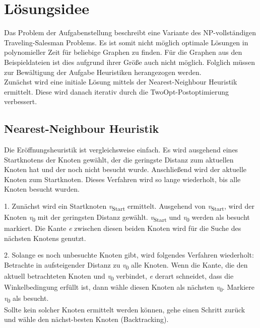 \maketitle
\tableofcontents

\vspace{0.5cm}


\section{Lösungsidee}\label{sec:losungsidee}
Das Problem der Aufgabenstellung beschreibt eine Variante des NP-vollständigen Traveling-Salesman Problems.
Es ist somit nicht möglich optimale Lösungen in polynomieller Zeit für beliebige Graphen zu finden.
Für die Graphen aus den Beispieldateien ist dies aufgrund ihrer Größe auch nicht möglich.
Folglich müssen zur Bewältigung der Aufgabe Heuristiken herangezogen werden. \\
Zunächst wird eine initiale Lösung mittels der Nearest-Neighbour Heuristik ermittelt.
Diese wird danach iterativ durch die TwoOpt-Postoptimierung verbessert.

\subsection{Nearest-Neighbour Heuristik}\label{subsec:nearest-neighbour-heuristik}
Die Eröffnungsheuristik ist vergleichsweise einfach.
Es wird ausgehend eines Startknotens der Knoten gewählt, der die
geringste Distanz zum aktuellen Knoten hat und der noch nicht besucht wurde.
Anschließend wird der aktuelle Knoten zum Startknoten.
Dieses Verfahren wird so lange wiederholt, bis alle Knoten besucht wurden.

1.
Zunächst wird ein Startknoten \textit{v}\textsubscript{Start} ermittelt.
Ausgehend von \textit{v}\textsubscript{Start}, wird der Knoten \textit{v}\textsubscript{0} mit der geringsten Distanz gewählt.
\textit{v}\textsubscript{Start} und \textit{v}\textsubscript{0} werden als besucht markiert.
Die Kante \textit{e} zwischen diesen beiden Knoten wird für die Suche des nächsten Knotens genutzt.

2.
Solange es noch unbesuchte Knoten gibt, wird folgendes Verfahren wiederholt:
Betrachte in aufsteigender Distanz zu \textit{v}\textsubscript{0} alle Knoten.
Wenn die Kante, die den aktuell betrachteten Knoten und \textit{v}\textsubscript{0} verbindet, \textit{e}
derart schneidet, dass die Winkelbedingung erfüllt ist, dann wähle diesen Knoten als nächsten \textit{v}\textsubscript{0}.
Markiere \textit{v}\textsubscript{0} als besucht. \\
Sollte kein solcher Knoten ermittelt werden können, gehe einen Schritt zurück und wähle den nächst-besten Knoten (Backtracking).

